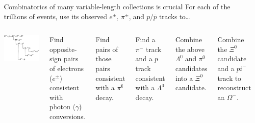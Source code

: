 \documentclass[aspectratio=169]{beamer}
\begin{document}
\begin{frame}{Combinatorics of many variable-length collections is crucial}
\vspace{0.25 cm}
For each of the trillions of events, use its observed $e^\pm$, $\pi^\pm$, and $p$/$\bar{p}$ tracks to\ldots

\vspace{0.25 cm}
\begin{columns}

\includegraphics[width=\linewidth]{decay-chain.png}

Find opposite-sign pairs of electrons ($e^\pm$) consistent with photon ($\gamma$) conversions.

\vspace{0.35 cm}
Find pairs of those pairs consistent with a $\pi^0$ decay.

\vspace{0.35 cm}
Find a $\pi^-$ track and a $p$ track consistent with a $\Lambda^0$ decay.

\vspace{0.35 cm}
Combine the above $\Lambda^0$ and $\pi^0$ candidates into a $\Xi^0$ candidate.

\vspace{0.35 cm}
Combine the $\Xi^0$ candidate and a $pi^-$ track to reconstruct an $\Omega^-$.
\end{columns}
\end{frame}
\end{document}
